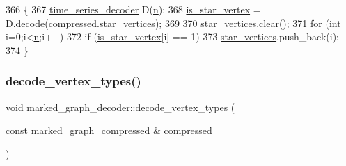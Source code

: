 \begin{DoxyCode}
366 \{
367   \hyperlink{classtime__series__decoder}{time\_series\_decoder} D(\hyperlink{classmarked__graph__decoder_aefc93611bc4a3e9a5d3956d97649a0e9}{n});
368   \hyperlink{classmarked__graph__decoder_a5c5391206cf2965b8513248e505ba48f}{is\_star\_vertex} = D.decode(compressed.\hyperlink{classmarked__graph__compressed_a7a4ced4586e2e353f9076bd447df5208}{star\_vertices});
369 
370   \hyperlink{classmarked__graph__decoder_a06fc05827db14b675f7ecc2fd915b533}{star\_vertices}.clear();
371   \textcolor{keywordflow}{for} (\textcolor{keywordtype}{int} i=0;i<\hyperlink{classmarked__graph__decoder_aefc93611bc4a3e9a5d3956d97649a0e9}{n};i++)
372     \textcolor{keywordflow}{if} (\hyperlink{classmarked__graph__decoder_a5c5391206cf2965b8513248e505ba48f}{is\_star\_vertex}[i] == 1)
373       \hyperlink{classmarked__graph__decoder_a06fc05827db14b675f7ecc2fd915b533}{star\_vertices}.push\_back(i);
374 \}
\end{DoxyCode}
\mbox{\label{classmarked__graph__decoder_afc0aea714483a4dda31dd85fd20bfe5f}} 
\subsubsection{\texorpdfstring{decode\+\_\+vertex\+\_\+types()}{decode\_vertex\_types()}}
{\footnotesize\ttfamily void marked\+\_\+graph\+\_\+decoder\+::decode\+\_\+vertex\+\_\+types (\begin{DoxyParamCaption}\item[{const \hyperlink{classmarked__graph__compressed}{marked\+\_\+graph\+\_\+compressed} \&}]{compressed }\end{DoxyParamCaption})\hspace{0.3cm}{\ttfamily [private]}}



